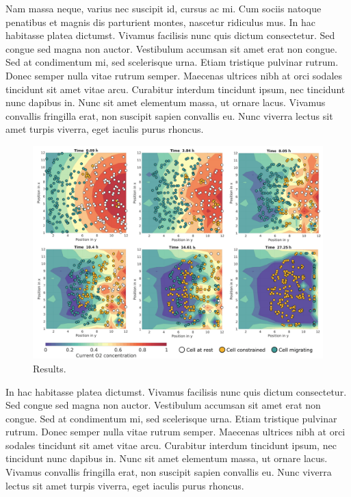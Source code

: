 Nam massa neque, varius nec suscipit id, cursus ac mi. Cum sociis natoque penatibus et magnis dis parturient montes, nascetur ridiculus mus. In hac habitasse platea dictumst. Vivamus facilisis nunc quis dictum consectetur. Sed congue sed magna non auctor. Vestibulum accumsan sit amet erat non congue. Sed at condimentum mi, sed scelerisque urna. Etiam tristique pulvinar rutrum. Donec semper nulla vitae rutrum semper. Maecenas ultrices nibh at orci sodales tincidunt sit amet vitae arcu. Curabitur interdum tincidunt ipsum, nec tincidunt nunc dapibus in. Nunc sit amet elementum massa, ut ornare lacus. Vivamus convallis fringilla erat, non suscipit sapien convallis eu. Nunc viverra lectus sit amet turpis viverra, eget iaculis purus rhoncus.

\begin{figure}[H]
\centering
\includegraphics[width=1.0\textwidth]{figures/chapter_1/images/lateral}
\caption[tab]{Results.}
\label{fig:results}
\end{figure}

In hac habitasse platea dictumst. Vivamus facilisis nunc quis dictum consectetur. Sed congue sed magna non auctor. Vestibulum accumsan sit amet erat non congue. Sed at condimentum mi, sed scelerisque urna. Etiam tristique pulvinar rutrum. Donec semper nulla vitae rutrum semper. Maecenas ultrices nibh at orci sodales tincidunt sit amet vitae arcu. Curabitur interdum tincidunt ipsum, nec tincidunt nunc dapibus in. Nunc sit amet elementum massa, ut ornare lacus. Vivamus convallis fringilla erat, non suscipit sapien convallis eu. Nunc viverra lectus sit amet turpis viverra, eget iaculis purus rhoncus.

